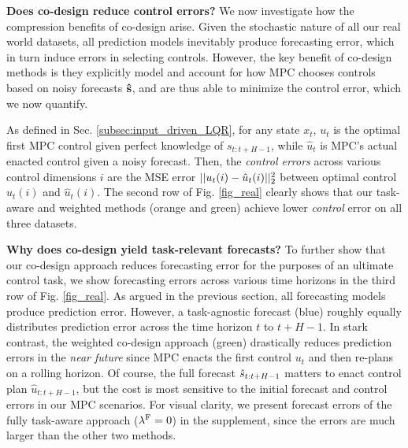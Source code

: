 \textbf{Does co-design reduce control errors?}
We now investigate how the compression benefits of co-design arise. Given the stochastic nature of all our real world datasets, all prediction models inevitably produce forecasting error, which in turn induce errors in selecting controls. However, the key benefit of co-design methods is they explicitly model and account for how MPC chooses controls based on noisy forecasts $\bold{\hat{s}}$, and are thus able to minimize the control error, which we now quantify.

As defined in Sec. \ref{subsec:input_driven_LQR}, for any state $x_t$, $u_t$ is the optimal first MPC control given perfect knowledge of $s_{t:t+H-1}$, while $\hat{u}_t$ is MPC's actual enacted control given a noisy forecast.
Then, the \textit{control errors} across various control dimensions $i$ are the MSE error $\vert\vert u_t(i)  - \hat{u}_t(i) \vert\vert^2_2$ between optimal control $u_t(i)$ and $\hat{u}_t(i)$. The second row of Fig. \ref{fig_real} clearly shows that our task-aware and weighted methods (orange and green) achieve lower \textit{control} error on all three datasets.

\textbf{Why does co-design yield task-relevant forecasts?} 
To further show that our co-design approach reduces forecasting error for the purposes of an ultimate control task, we show forecasting errors across various time horizons in the third row of Fig. \ref{fig_real}. As argued in the previous section, all forecasting models produce prediction error. However, a task-agnostic forecast (blue) roughly equally distributes prediction error across the time horizon $t$ to $t+H-1$. In stark contrast, the weighted co-design approach (green) drastically reduces prediction errors in the \textit{near future} since MPC enacts the first control $u_t$ and then re-plans on a rolling horizon. Of course, the full forecast $\hat{s}_{t:t+H-1}$ matters to enact control plan $\hat{u}_{t:t+H-1}$, but the cost is most sensitive to the initial forecast and control errors in our MPC scenarios. For visual clarity, we present forecast errors of the fully task-aware approach ($\lambda^{\mathrm{F}} = 0$) in the supplement, since the errors are much larger than the other two methods. 

